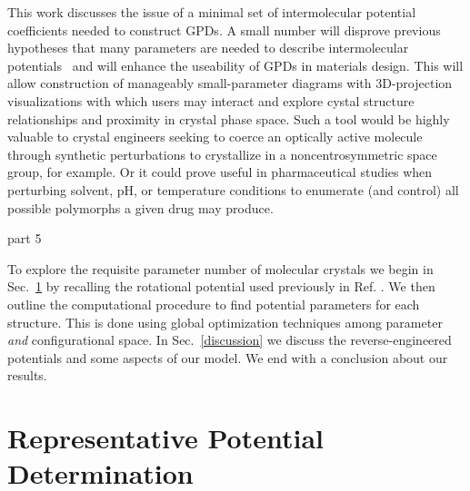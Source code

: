 \documentclass[preprint]{revtex4}
\begin{document}
This work discusses the issue of a minimal set of intermolecular potential coefficients needed to construct GPDs.  A small number will disprove previous hypotheses that many parameters are needed to describe intermolecular potentials~\cite{Briels80} and will enhance the useability of GPDs in materials design. This will allow construction of manageably small-parameter diagrams with 3D-projection visualizations with which users may interact and explore cystal structure relationships and proximity in crystal phase space.  Such a tool would be highly valuable to crystal engineers seeking to coerce an optically active molecule through synthetic perturbations to crystallize in a noncentrosymmetric space group, for example. Or it could prove useful in pharmaceutical studies when perturbing solvent, pH, or temperature conditions to enumerate (and control) all possible polymorphs a given drug may produce. 

part 5

To explore the requisite parameter number of molecular crystals we begin in Sec.~\ref{method} by recalling the rotational potential used previously in Ref. \cite{Mettes04}.  We then outline the computational procedure to find potential parameters for each structure. This
is done using global optimization techniques among parameter
\emph{and} configurational space. In Sec.~\ref{discussion} we
discuss the reverse-engineered potentials and some aspects of our model. We end with a conclusion
about our results.


\section{Representative Potential Determination}
\label{method}
\end{document}
